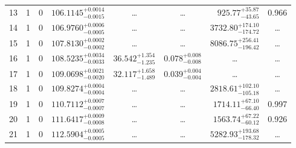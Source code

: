 \begin{table*}[!]
\begin{tabular}{llcrrlrc}
13 & 1 & 0 & $    106.1145_{-      0.0015}^{+      0.0014}$ & \multicolumn{1}{c}{\dots} & \multicolumn{1}{c}{\dots} & $      925.77_{-       43.65}^{+       35.87}$ & 0.966 \\[1pt]
14 & 1 & 0 & $    106.9760_{-      0.0005}^{+      0.0006}$ & \multicolumn{1}{c}{\dots} & \multicolumn{1}{c}{\dots} & $     3732.80_{-      174.72}^{+      174.10}$ & \dots\\[1pt]
15 & 1 & 0 & $    107.8130_{-      0.0002}^{+      0.0002}$ & \multicolumn{1}{c}{\dots} & \multicolumn{1}{c}{\dots} & $     8086.75_{-      196.42}^{+      256.41}$ & \dots\\[1pt]
16 & 1 & 0 & $    108.5235_{-      0.0033}^{+      0.0034}$ & $      36.542_{-       1.235}^{+       1.354}$ & $       0.078_{-       0.008}^{+       0.008}$ & \multicolumn{1}{c}{\dots} & \dots\\[1pt]
17 & 1 & 0 & $    109.0698_{-      0.0020}^{+      0.0021}$ & $      32.117_{-       1.489}^{+       1.658}$ & $       0.039_{-       0.004}^{+       0.004}$ & \multicolumn{1}{c}{\dots} & \dots\\[1pt]
18 & 1 & 0 & $    109.8274_{-      0.0004}^{+      0.0004}$ & \multicolumn{1}{c}{\dots} & \multicolumn{1}{c}{\dots} & $     2818.61_{-      105.18}^{+      102.10}$ & \dots\\[1pt]
19 & 1 & 0 & $    110.7112_{-      0.0007}^{+      0.0007}$ & \multicolumn{1}{c}{\dots} & \multicolumn{1}{c}{\dots} & $     1714.11_{-       66.40}^{+       67.10}$ & 0.997\\[1pt]
20 & 1 & 0 & $    111.6417_{-      0.0008}^{+      0.0009}$ & \multicolumn{1}{c}{\dots} & \multicolumn{1}{c}{\dots} & $     1563.74_{-       60.12}^{+       67.22}$ & 0.926\\[1pt]
21 & 1 & 0 & $    112.5904_{-      0.0005}^{+      0.0005}$ & \multicolumn{1}{c}{\dots} & \multicolumn{1}{c}{\dots} & $     5282.93_{-      178.32}^{+      193.68}$ & \dots \\[1pt]


\end{tabular}
\end{table*}
